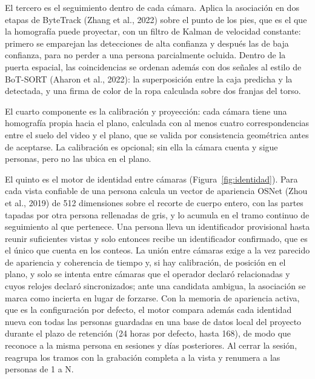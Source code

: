El tercero es el seguimiento dentro de cada cámara. Aplica la asociación en dos etapas de
ByteTrack (Zhang et al., 2022) sobre el punto de los pies, que es el que la homografía puede
proyectar, con un filtro de Kalman de velocidad constante: primero se emparejan las
detecciones de alta confianza y después las de baja confianza, para no perder a una persona
parcialmente ocluida. Dentro de la puerta espacial, las coincidencias se ordenan además con
dos señales al estilo de BoT-SORT (Aharon et al., 2022): la superposición entre la caja predicha
y la detectada, y una firma de color de la ropa calculada sobre dos franjas del torso.

El cuarto componente es la calibración y proyección: cada cámara tiene una homografía propia
hacia el plano, calculada con al menos cuatro correspondencias entre el suelo del video y el
plano, que se valida por consistencia geométrica antes de aceptarse. La calibración es
opcional; sin ella la cámara cuenta y sigue personas, pero no las ubica en el plano.

El quinto es el motor de identidad entre cámaras (Figura~\ref{fig:identidad}). Para cada vista
confiable de una persona calcula un vector de apariencia OSNet (Zhou et al., 2019) de 512
dimensiones sobre el recorte de cuerpo entero, con las partes tapadas por otra persona
rellenadas de gris, y lo acumula en el tramo continuo de seguimiento al que pertenece. Una
persona lleva un identificador provisional hasta reunir suficientes vistas y solo entonces recibe
un identificador confirmado, que es el único que cuenta en los conteos. La unión entre cámaras
exige a la vez parecido de apariencia y coherencia de tiempo y, si hay calibración, de posición
en el plano, y solo se intenta entre cámaras que el operador declaró relacionadas y cuyos relojes
declaró sincronizados; ante una candidata ambigua, la asociación se marca como incierta en
lugar de forzarse. Con la memoria de apariencia activa, que es la configuración por defecto, el
motor compara además cada identidad nueva con todas las personas guardadas en una base
de datos local del proyecto durante el plazo de retención (24 horas por defecto, hasta 168), de
modo que reconoce a la misma persona en sesiones y días posteriores. Al cerrar la sesión,
reagrupa los tramos con la grabación completa a la vista y renumera a las personas de 1 a N.

